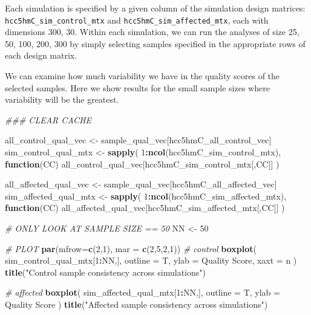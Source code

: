 \documentclass[
]{book}
\newenvironment{Shaded}{\begin{snugshade}}{\end{snugshade}}
\newcommand{\CommentTok}[1]{\textcolor[rgb]{0.56,0.35,0.01}{\textit{#1}}}
\newcommand{\ControlFlowTok}[1]{\textcolor[rgb]{0.13,0.29,0.53}{\textbf{#1}}}
\newcommand{\DataTypeTok}[1]{\textcolor[rgb]{0.13,0.29,0.53}{#1}}
\newcommand{\DecValTok}[1]{\textcolor[rgb]{0.00,0.00,0.81}{#1}}
\newcommand{\KeywordTok}[1]{\textcolor[rgb]{0.13,0.29,0.53}{\textbf{#1}}}
\newcommand{\NormalTok}[1]{#1}
\newcommand{\OperatorTok}[1]{\textcolor[rgb]{0.81,0.36,0.00}{\textbf{#1}}}
\newcommand{\StringTok}[1]{\textcolor[rgb]{0.31,0.60,0.02}{#1}}
\begin{document}
Each simulation is specified by a given column of the simulation design matrices:
\texttt{hcc5hmC\_sim\_control\_mtx} and \texttt{hcc5hmC\_sim\_affected\_mtx}, each with dimensions 300, 30.
Within each simulation, we can run the analyses of size 25, 50, 100, 200, 300 by simply selecting
samples specified in the appropriate rows of each design matrix.

We can examine how much variability we have in the quality scores of the selected samples.
Here we show results for the small sample sizes where variability will be the greatest.

\begin{Shaded}
\begin{Highlighting}[]
\CommentTok{\#\#\# CLEAR CACHE}

\NormalTok{all\_control\_qual\_vec <{-}}\StringTok{ }\NormalTok{sample\_qual\_vec[hcc5hmC\_all\_control\_vec]}
\NormalTok{sim\_control\_qual\_mtx <{-}}\StringTok{ }\KeywordTok{sapply}\NormalTok{(}
  \DecValTok{1}\OperatorTok{:}\KeywordTok{ncol}\NormalTok{(hcc5hmC\_sim\_control\_mtx), }
  \ControlFlowTok{function}\NormalTok{(CC) all\_control\_qual\_vec[hcc5hmC\_sim\_control\_mtx[,CC]]}
\NormalTok{ )}

\NormalTok{all\_affected\_qual\_vec <{-}}\StringTok{ }\NormalTok{sample\_qual\_vec[hcc5hmC\_all\_affected\_vec]}
\NormalTok{sim\_affected\_qual\_mtx <{-}}\StringTok{ }\KeywordTok{sapply}\NormalTok{(}
  \DecValTok{1}\OperatorTok{:}\KeywordTok{ncol}\NormalTok{(hcc5hmC\_sim\_affected\_mtx),  }
  \ControlFlowTok{function}\NormalTok{(CC) all\_affected\_qual\_vec[hcc5hmC\_sim\_affected\_mtx[,CC]]}
\NormalTok{ )}

\CommentTok{\# ONLY LOOK AT SAMPLE SIZE == 50}
\NormalTok{NN <{-}}\StringTok{ }\DecValTok{50}

\CommentTok{\# PLOT}
\KeywordTok{par}\NormalTok{(}\DataTypeTok{mfrow=}\KeywordTok{c}\NormalTok{(}\DecValTok{2}\NormalTok{,}\DecValTok{1}\NormalTok{), }\DataTypeTok{mar =} \KeywordTok{c}\NormalTok{(}\DecValTok{2}\NormalTok{,}\DecValTok{5}\NormalTok{,}\DecValTok{2}\NormalTok{,}\DecValTok{1}\NormalTok{))}
\CommentTok{\# control}
\KeywordTok{boxplot}\NormalTok{(}
\NormalTok{  sim\_control\_qual\_mtx[}\DecValTok{1}\OperatorTok{:}\NormalTok{NN,],}
  \DataTypeTok{outline =}\NormalTok{ T, }
  \DataTypeTok{ylab =} \StringTok{\textquotesingle{}Quality Score\textquotesingle{}}\NormalTok{,}
  \DataTypeTok{xaxt =} \StringTok{\textquotesingle{}n\textquotesingle{}}
\NormalTok{)}
\KeywordTok{title}\NormalTok{(}\StringTok{"Control sample consistency across simulations"}\NormalTok{)}

\CommentTok{\# affected}
\KeywordTok{boxplot}\NormalTok{(}
\NormalTok{  sim\_affected\_qual\_mtx[}\DecValTok{1}\OperatorTok{:}\NormalTok{NN,],}
  \DataTypeTok{outline =}\NormalTok{ T, }
  \DataTypeTok{ylab =} \StringTok{\textquotesingle{}Quality Score\textquotesingle{}}
\NormalTok{)}
\KeywordTok{title}\NormalTok{(}\StringTok{"Affected sample consistency across simulations"}\NormalTok{)}
\end{Highlighting}
\end{Shaded}
\end{document}
